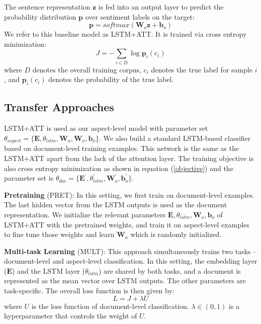 \documentclass[11pt,a4paper]{article}
\begin{document}
The sentence representation $\mathbf{z}$ is fed into an output layer to predict the probability distribution $\mathbf{p}$ over sentiment labels on the target:
\begin{equation}
\mathbf{p}=softmax(\mathbf{W}_o \mathbf{z} + \mathbf{b}_o) \label{output layer}
\end{equation}
We refer to this baseline model as LSTM+ATT. It is trained via cross entropy minimization:
\begin{equation}
J = -\sum_{i \in D} \log \mathbf{p}_i(c_i) \label{objective}
\end{equation}
where $D$ denotes the overall training corpus, $c_i$ denotes the true label for sample $i$, and $\mathbf{p}_i(c_i)$ denotes the probability of the true label.


\subsection{Transfer Approaches}
LSTM+ATT is used as our aspect-level model with parameter set $\theta_{aspect} = \{ \mathbf{E}, \theta_{lstm}, \mathbf{W}_a, \mathbf{W}_o, \mathbf{b}_o \}$. We also build a standard LSTM-based classifier based on document-level training examples. This network is the same as the LSTM+ATT apart from the lack of the attention layer. The training objective is also cross entropy minimization as shown in equation (\ref{objective}) and the parameter set is $\theta_{doc} = \{ \mathbf{E}^{\prime}, \theta_{lstm}^{\prime}, \mathbf{W}_o^{\prime}, \mathbf{b}_o^{\prime} \}$.
\medskip

\noindent\textbf{Pretraining} (PRET): In this setting, we first train on document-level examples. The last hidden vector from the LSTM outputs is used as the document representation.
We initialize the relevant parameters $\mathbf{E}, \theta_{lstm}, \mathbf{W}_o, \mathbf{b}_o$ of LSTM+ATT with the pretrained weights, and train it on aspect-level examples to fine tune those weights and learn $\mathbf{W}_a$ which is randomly initialized.
\medskip

\noindent\textbf{Multi-task Learning} (MULT): This approach simultaneously trains two tasks -- document-level and aspect-level classification. In this setting, the embedding layer ($\mathbf{E}$) and the LSTM layer ($\theta_{lstm}$) are shared by both tasks, and a document is represented as the mean vector over LSTM outputs.  The other parameters are task-specific. The overall loss function is then given by:
\begin{equation}
L = J + \lambda U \label{overall objective}
\end{equation}
where $U$ is the loss function of document-level classification. $\lambda \in (0,1)$ is a hyperparameter that controls the weight of $U$.
\medskip
\end{document}
